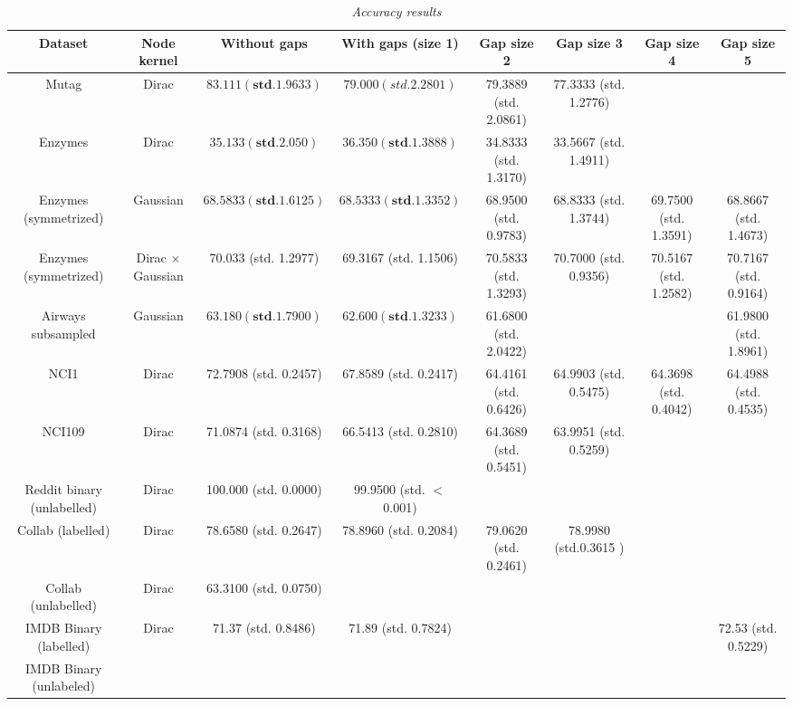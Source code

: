\documentclass{article}
\begin{document}
\begin{table}[H]
	\centering
	\hspace*{-0.7in}
	\scalebox{0.6} {
		\begin{tabular}{c|c|c|c|c|c|c|c}
		Dataset & Node kernel & Without gaps & With gaps (size 1) & Gap size 2 & Gap size 3 & Gap size 4 & Gap size 5\\
		\hline
		Mutag & Dirac & $\mathbf{83.111 (std. 1.9633)}$ & $79.000 (std. 2.2801)$ & 79.3889 (std. 2.0861) & 77.3333 (std. 1.2776) & & \\
		Enzymes & Dirac & $\mathbf{35.133 (std. 2.050)}$ & $\mathbf{36.350 (std. 1.3888)}$ & 34.8333 (std. 1.3170) & 33.5667 (std. 1.4911) & & \\
		Enzymes (symmetrized) & Gaussian & $\mathbf{68.5833 (std. 1.6125)}$ & $\mathbf{68.5333 (std. 1.3352)}$ & 68.9500 (std. 0.9783) & 68.8333 (std. 1.3744) & 69.7500 (std. 1.3591) & 68.8667 (std. 1.4673) \\
		Enzymes (symmetrized) & Dirac $\times$ Gaussian & 70.033 (std. 1.2977) & 69.3167 (std. 1.1506) & 70.5833 (std. 1.3293) & 70.7000 (std. 0.9356) & 70.5167 (std. 1.2582) & 70.7167 (std. 0.9164)\\
		Airways subsampled & Gaussian & $\mathbf{63.180 (std. 1.7900)}$ & $\mathbf{62.600 (std. 1.3233)}$ & 61.6800 (std. 2.0422) & & & 61.9800 (std. 1.8961) \\
		NCI1 & Dirac & 72.7908 (std. 0.2457) & 67.8589 (std. 0.2417) & 64.4161 (std. 0.6426) & 64.9903 (std. 0.5475) & 64.3698 (std. 0.4042) & 64.4988 (std. 0.4535) \\
		NCI109 & Dirac & 71.0874 (std. 0.3168) & 66.5413 (std. 0.2810) & 64.3689 (std. 0.5451) & 63.9951 (std. 0.5259) & & \\
		Reddit binary (unlabelled) & Dirac & 100.000 (std. 0.0000) & 99.9500 (std. $<$ 0.001) & & & &  \\
	
		Collab (labelled) & Dirac & 78.6580 (std. 0.2647) & 78.8960 (std. 0.2084) & 79.0620 (std. 0.2461) & 78.9980 (std.0.3615 ) & \\
		Collab (unlabelled) & Dirac & 63.3100 (std. 0.0750) & & & & & \\
		IMDB Binary (labelled) & Dirac & 71.37 (std. 0.8486) & 71.89 (std. 0.7824) & & & & 72.53 (std. 0.5229) \\
		IMDB Binary (unlabeled) & 
		


		\end{tabular}
	}
	\caption{\textit{Accuracy results}}
	\label{table:raccuracy_results}
\end{table}
\end{document}
